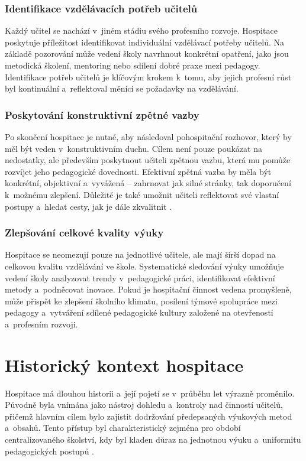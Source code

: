 \subsubsection{Identifikace vzdělávacích potřeb učitelů}

Každý učitel se nachází v~jiném stádiu svého profesního rozvoje. Hospitace poskytuje příležitost identifikovat individuální vzdělávací potřeby učitelů. Na základě pozorování může vedení školy navrhnout konkrétní opatření, jako jsou metodická školení, mentoring nebo sdílení dobré praxe mezi pedagogy. Identifikace potřeb učitelů je klíčovým krokem k~tomu, aby jejich profesní růst byl kontinuální a~reflektoval měnící se požadavky na vzdělávání.

\subsubsection{Poskytování konstruktivní zpětné vazby}

Po skončení hospitace je nutné, aby následoval pohospitační rozhovor, který by měl být veden v~konstruktivním duchu. Cílem není pouze poukázat na nedostatky, ale především poskytnout učiteli zpětnou vazbu, která mu pomůže rozvíjet jeho pedagogické dovednosti. Efektivní zpětná vazba by měla být konkrétní, objektivní a~vyvážená – zahrnovat jak silné stránky, tak doporučení k~možnému zlepšení. Důležité je také umožnit učiteli reflektovat své vlastní postupy a~hledat cesty, jak je dále zkvalitnit \cite{rozvijejici-hospotace}. 

\subsubsection{Zlepšování celkové kvality výuky}

Hospitace se neomezují pouze na jednotlivé učitele, ale mají širší dopad na celkovou kvalitu vzdělávání ve škole. Systematické sledování výuky umožňuje vedení školy analyzovat trendy v~pedagogické práci, identifikovat efektivní metody a~podněcovat inovace. Pokud je hospitační činnost vedena promyšleně, může přispět ke zlepšení školního klimatu, posílení týmové spolupráce mezi pedagogy a~vytváření sdílené pedagogické kultury založené na otevřenosti a~profesním rozvoji.


\section{Historický kontext hospitace}

Hospitace má dlouhou historii a~její pojetí se v~průběhu let výrazně proměnilo. Původně byla vnímána jako nástroj dohledu a~kontroly nad činností učitelů, přičemž hlavním cílem bylo zajistit dodržování předepsaných výukových metod a~obsahů. Tento přístup byl charakteristický zejména pro období centralizovaného školství, kdy byl kladen důraz na jednotnou výuku a~uniformitu pedagogických postupů \cite{ped-proces-rizeni}.

